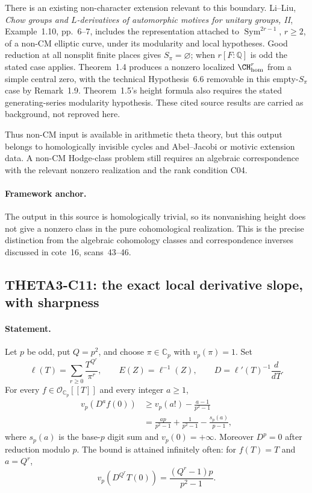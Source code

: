 \documentclass[11pt]{article}
\newcommand{\Q}{\mathbb Q}\newcommand{\C}{\mathbb C}\newcommand{\Z}{\mathbb Z}\newcommand{\R}{\mathbb R}\newcommand{\A}{\mathbb A}\newcommand{\OO}{\mathcal O}
\theoremstyle{definition}\newtheorem{definition}[theorem]{Definition}\newtheorem{remark}[theorem]{Remark}
\begin{document}
There is an existing non-character extension relevant to this
boundary. Li--Liu, \emph{Chow groups and $L$-derivatives of
automorphic motives for unitary groups, II}, Example~1.10,
pp.~6--7, includes the representation attached to
$\operatorname{Sym}^{2r-1}$, $r\geq2$, of a non-CM elliptic curve,
under its modularity and local hypotheses. Good reduction at all
nonsplit finite places gives $S_\pi=\varnothing$; when
$r[F:\Q]$ is odd the stated case applies. Theorem~1.4 produces a
nonzero localized $\CH^r_{\mathrm{hom}}$ from a simple central zero,
with the technical Hypothesis~6.6 removable in this empty-$S_\pi$
case by Remark~1.9. Theorem~1.5's height formula also requires the
stated generating-series modularity hypothesis. These cited source
results are carried as background, not reproved here.

Thus non-CM input is available in arithmetic theta theory, but this
output belongs to homologically invisible cycles and
Abel--Jacobi or motivic extension data. A non-CM Hodge-class problem
still requires an algebraic correspondence with the relevant
nonzero realization and the rank condition C04.

\paragraph{Framework anchor.}
The output in this source is homologically trivial, so its nonvanishing
height does not give a nonzero class in the pure cohomological realization.
This is the precise distinction from the algebraic cohomology classes
and correspondence inverses discussed in cote~16, scans~43--46.

\subsection{THETA3-C11: the exact local derivative slope, with sharpness}\label{C11}

\paragraph{Statement.}
Let $p$ be odd, put $Q=p^2$, and choose $\pi\in\C_p$ with
$v_p(\pi)=1$. Set
\[
 \ell(T)=\sum_{r\geq0}\frac{T^{Q^r}}{\pi^r},\qquad
 E(Z)=\ell^{-1}(Z),\qquad D=\ell'(T)^{-1}\frac{d}{dT}.
\]
For every $f\in\mathcal O_{\C_p}[[T]]$ and every integer $a\geq1$,
\begin{align*}
 v_p(D^af(0))
 &\geq v_p(a!)-\frac{a-1}{p^2-1}\\
 &=\frac{ap}{p^2-1}+\frac1{p^2-1}
                     -\frac{s_p(a)}{p-1},
\end{align*}
where $s_p(a)$ is the base-$p$ digit sum and $v_p(0)=+\infty$.
Moreover $D^p=0$ after reduction modulo $p$.
The bound is attained infinitely often: for $f(T)=T$ and $a=Q^r$,
\[
 v_p(D^{Q^r}T(0))=\frac{(Q^r-1)p}{p^2-1}.
\]
\end{document}
